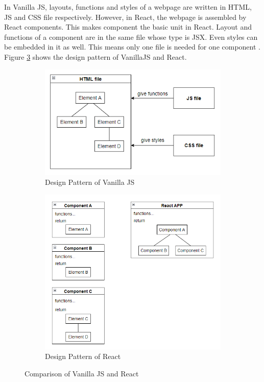 \documentclass[12pt,twoside]{report}
\begin{document}
In Vanilla JS, layouts, functions and styles of a webpage are written in HTML, JS and CSS file respectively. However, in React, the webpage is assembled by React components. This makes component the basic unit in React. Layout and functions of a component are in the same file whose type is JSX. Even styles can be embedded in it as well. This means only one file is needed for one component \cite{rawat2020reactjs}. Figure \ref{fig:vanillajs-react-compare} shows the design pattern of VanillaJS and React. 
\begin{figure}[h]
    \centering
    \begin{subfigure}{0.7\linewidth}
        \includegraphics[width=\linewidth, frame]{figures/vanillajs-design-pattern.png}
        \caption{Design Pattern of Vanilla JS}
        \label{fig:vanillajs-design-pattern}
    \end{subfigure}
    \begin{subfigure}{0.7\linewidth}
        \includegraphics[width=\linewidth, frame]{figures/react-structure.png}
        \caption{Design Pattern of React}
        \label{fig:react-structure}
    \end{subfigure}
    \caption{Comparison of Vanilla JS and React}
    \label{fig:vanillajs-react-compare}
\end{figure}
\end{document}
